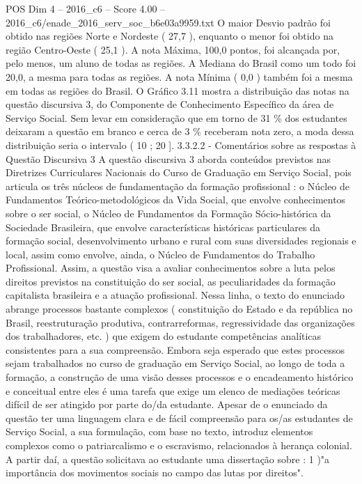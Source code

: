 \begin{textsample}{POS Dim 4 – 2016\_c6 – Score 4.00 – 2016\_c6/enade\_2016\_serv\_soc\_b6e03a9959.txt}
O maior Desvio padrão foi obtido nas regiões Norte e Nordeste ( 27,7 ), enquanto o menor foi obtido na região Centro-Oeste ( 25,1 ).
A nota Máxima, 100,0 pontos, foi alcançada por, pelo menos, um aluno de todas as regiões.
A Mediana do Brasil como um todo foi 20,0, a mesma para todas as regiões.
A nota Mínima ( 0,0 ) também foi a mesma em todas as regiões do Brasil.
O Gráfico 3.11 mostra a distribuição das notas na questão discursiva 3, do Componente de Conhecimento Específico da área de Serviço Social.
Sem levar em consideração que em torno de 31 \% dos estudantes deixaram a questão em branco e cerca de 3 \% receberam nota zero, a moda dessa distribuição seria o intervalo ( 10 ; 20 ]. 3.3.2.2 - Comentários sobre as respostas à Questão Discursiva 3 A questão discursiva 3 aborda conteúdos previstos nas Diretrizes Curriculares Nacionais do Curso de Graduação em Serviço Social, pois articula os três núcleos de fundamentação da formação profissional : o Núcleo de Fundamentos Teórico-metodológicos da Vida Social, que envolve conhecimentos sobre o ser social, o Núcleo de Fundamentos da Formação Sócio-histórica da Sociedade Brasileira, que envolve características históricas particulares da formação social, desenvolvimento urbano e rural com suas diversidades regionais e local, assim como envolve, ainda, o Núcleo de Fundamentos do Trabalho Profissional.
Assim, a questão visa a avaliar conhecimentos sobre a luta pelos direitos previstos na constituição do ser social, as peculiaridades da formação capitalista brasileira e a atuação profissional.
Nessa linha, o texto do enunciado abrange processos bastante complexos ( constituição do Estado e da república no Brasil, reestruturação produtiva, contrarreformas, regressividade das organizações dos trabalhadores, etc. ) que exigem do estudante competências analíticas consistentes para a sua compreensão.
Embora seja esperado que estes processos sejam trabalhados no curso de graduação em Serviço Social, ao longo de toda a formação, a construção de uma visão desses processos e o encadeamento histórico e conceitual entre eles é uma tarefa que exige um elenco de mediações teóricas difícil de ser atingido por parte do/da estudante.
Apesar de o enunciado da questão ter uma linguagem clara e de fácil compreensão para os/as estudantes de Serviço Social, a sua formulação, com base no texto, introduz elementos complexos como o patriarcalismo e o escravismo, relacionados à herança colonial.
A partir daí, a questão solicitava ao estudante uma dissertação sobre : 1 )"a importância dos movimentos sociais no campo das lutas por direitos".

\end{textsample}
